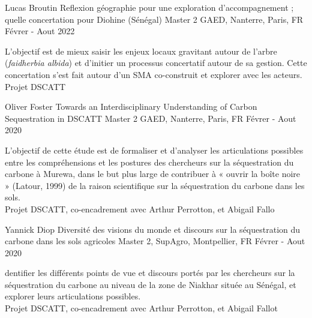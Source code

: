 \begin{cventries}
    \cventry
        {Lucas Broutin} %
        {Reflexion géographie pour une exploration d'accompagnement ; quelle concertation pour Diohine (Sénégal)} %
        {Master 2 GAED, Nanterre, Paris, FR} %
        {Févrer - Aout 2022} %
        {
        \begin{cvitems} %
            L'objectif est de mieux saisir les enjeux locaux gravitant autour de l’arbre (\textit{faidherbia albida}) et d'initier un processus concertatif autour de sa gestion. Cette concertation s'est fait autour d'un SMA co-construit et explorer avec les acteurs.\\
            Projet DSCATT
        \end{cvitems}
        }


    \cventry
        {Oliver Foster} %
        {Towards an Interdisciplinary Understanding of Carbon Sequestration in
        DSCATT} %
        {Master 2 GAED, Nanterre, Paris, FR} %
        {Févrer - Aout 2020} %
        {
        \begin{cvitems} %
            L'objectif de cette étude est de formaliser et d'analyser les articulations possibles entre les compréhensions et les postures des chercheurs sur la séquestration du carbone à Murewa, dans le but plus large de contribuer à « ouvrir la boîte noire » (Latour, 1999) de la raison scientifique sur la séquestration du carbone dans les sols.\\
            Projet DSCATT, co-encadrement avec Arthur Perrotton, et Abigail Fallo
        \end{cvitems}
        }


    \cventry
        {Yannick Diop} %
        {Diversité des visions du monde et discours sur la séquestration du carbone dans les sols agricoles} %
        {Master 2, SupAgro, Montpellier, FR} %
        {Févrer - Aout 2020} %
        {
        \begin{cvitems} %
            dentifier les différents points de vue et discours portés par les chercheurs sur la séquestration du carbone au niveau de la zone de Niakhar située au Sénégal, et explorer leurs articulations possibles.\\
            Projet DSCATT, co-encadrement avec Arthur Perrotton, et Abigail Fallot
        \end{cvitems}
        }
  

 
\end{cventries}
